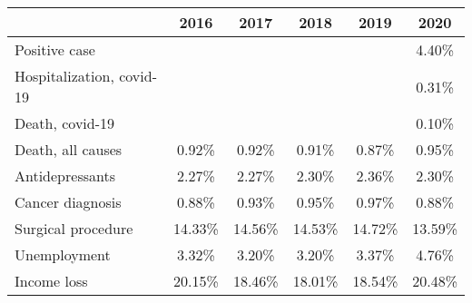 
\begin{tabular}{@{}l*{5}{S[table-format={}2.2{\%}]}@{}}
\toprule
{} & {2016} & {2017} & {2018} & {2019} & {2020}\tabularnewline%
\midrule
Positive case &  &  &  &  & 4.40\%\tabularnewline%
Hospitalization, covid-19 &  &  &  &  & 0.31\%\tabularnewline%
Death, covid-19 &  &  &  &  & 0.10\%\tabularnewline%
Death, all causes & 0.92\% & 0.92\% & 0.91\% & 0.87\% & 0.95\%\tabularnewline%
Antidepressants & 2.27\% & 2.27\% & 2.30\% & 2.36\% & 2.30\%\tabularnewline%
Cancer diagnosis & 0.88\% & 0.93\% & 0.95\% & 0.97\% & 0.88\%\tabularnewline%
Surgical procedure & 14.33\% & 14.56\% & 14.53\% & 14.72\% & 13.59\%\tabularnewline%
Unemployment & 3.32\% & 3.20\% & 3.20\% & 3.37\% & 4.76\%\tabularnewline%
Income loss & 20.15\% & 18.46\% & 18.01\% & 18.54\% & 20.48\%\tabularnewline%
\bottomrule
\end{tabular}
